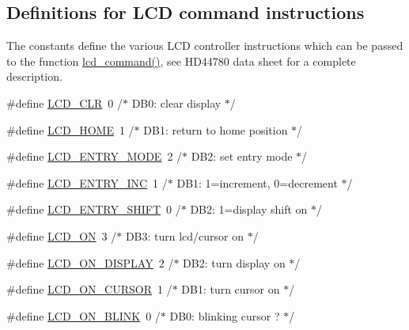 \subsection*{Definitions for L\+CD command instructions}
\label{_amgrpe1b1604cb195ab970ebf8b6b8b3e322f}%
The constants define the various L\+CD controller instructions which can be passed to the function \mbox{\hyperlink{group__pfleury__lcd_gaea9d14f02df06f948cb5a56776980826}{lcd\+\_\+command()}}, see H\+D44780 data sheet for a complete description. \begin{DoxyCompactItemize}
\item 
\#define \mbox{\hyperlink{group__pfleury__lcd_ga459688213267d13ccfbeb2c9004988cb}{L\+C\+D\+\_\+\+C\+LR}}~0      /$\ast$ D\+B0\+: clear display                  $\ast$/
\item 
\#define \mbox{\hyperlink{group__pfleury__lcd_gae0e309ccad89222eb3457f2da9f2bb8d}{L\+C\+D\+\_\+\+H\+O\+ME}}~1      /$\ast$ D\+B1\+: return to home position        $\ast$/
\item 
\#define \mbox{\hyperlink{group__pfleury__lcd_gae5d757ddb6d94de8c82191b60b40e442}{L\+C\+D\+\_\+\+E\+N\+T\+R\+Y\+\_\+\+M\+O\+DE}}~2      /$\ast$ D\+B2\+: set entry mode                 $\ast$/
\item 
\#define \mbox{\hyperlink{group__pfleury__lcd_gada766266a0be0d0040fbf86e23b58aa6}{L\+C\+D\+\_\+\+E\+N\+T\+R\+Y\+\_\+\+I\+NC}}~1      /$\ast$   D\+B1\+: 1=increment, 0=decrement     $\ast$/
\item 
\#define \mbox{\hyperlink{group__pfleury__lcd_ga14d0c7fda147e0dc8cdaa4a2629b3532}{L\+C\+D\+\_\+\+E\+N\+T\+R\+Y\+\_\+\+S\+H\+I\+FT}}~0      /$\ast$   D\+B2\+: 1=display shift on           $\ast$/
\item 
\#define \mbox{\hyperlink{group__pfleury__lcd_ga47a809dfec086fdeca93dedc4fb83b44}{L\+C\+D\+\_\+\+ON}}~3      /$\ast$ D\+B3\+: turn lcd/cursor on             $\ast$/
\item 
\#define \mbox{\hyperlink{group__pfleury__lcd_gae84f634b0a1661c4d5bbaafd9397732a}{L\+C\+D\+\_\+\+O\+N\+\_\+\+D\+I\+S\+P\+L\+AY}}~2      /$\ast$   D\+B2\+: turn display on              $\ast$/
\item 
\#define \mbox{\hyperlink{group__pfleury__lcd_ga47638b5ebbaec9600a0ebf9a55caf802}{L\+C\+D\+\_\+\+O\+N\+\_\+\+C\+U\+R\+S\+OR}}~1      /$\ast$   D\+B1\+: turn cursor on               $\ast$/
\item 
\#define \mbox{\hyperlink{group__pfleury__lcd_ga5d76592a978537acee615098ce4d80f5}{L\+C\+D\+\_\+\+O\+N\+\_\+\+B\+L\+I\+NK}}~0      /$\ast$     D\+B0\+: blinking cursor ?          $\ast$/

\end{DoxyCompactItemize}
